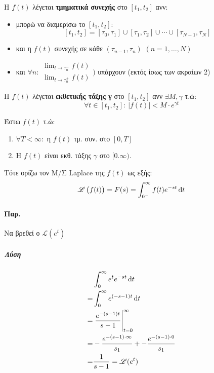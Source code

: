 \documentclass[11pt,a4paper,titlepage,draft]{article}
\begin{document}
\begin{defn*}{}
Η $f(t)$ λέγεται \textbf{τμηματικά συνεχής} στο $[t_1,t_2]$ ανν:
\begin{itemize}
\item μπορώ να διαμερίσω το $[t_1,t_2]$:
\[
[t_1,t_2]=[\tau_0,\tau_1]\cup[\tau_1,\tau_2]\cup\cdots\cup[\tau_{N-1},\tau_N]
\]
\item και η $f(t)$ συνεχής σε κάθε $(\tau_{n-1},\tau_n)$ $(n=1,\dots,N)$
\item και \(\forall n: \begin{matrix}
\lim_{t\to\tau_n^-}f(t)\\
\lim_{t\to\tau_n^+}f(t)
\end{matrix})
\) υπάρχουν (εκτός ίσως των ακραίων 2)
\end{itemize}
\end{defn*}

\begin{defn*}{}
Η \(f(t)\) λέγεται \textbf{εκθετικής τάξης γ} στο $[t_1,t_2]$ ανν \(\exists M,\gamma\) τ.ώ:
\[
\forall t \in [t_1,t_2]:\ \left|f(t)\right|<M\cdot e^{\gamma t}
\]
\end{defn*}

\begin{defn*}{}
Έστω $f(t)$ τ.ώ:
\begin{enumerate}
\item \(\forall T<\infty: \) η $f(t)$ τμ. συν. στο \([0,T]\)
\item Η $f(t)$ είναι εκθ. τάξης $\gamma$ στο \([0.\infty)\).
\end{enumerate}

Τότε ορίζω τον Μ/Σ \textlatin{Laplace} της $f(t)$ ως εξής:
\[
\mathscr{L}\left(f(t)\right) = F(s)=\int_{0^-}^\infty f(t)e^{-st}\dif t
\]
\end{defn*}

\paragraph{Παρ.}
Να βρεθεί ο $\mathscr{L}(e^t)$
\subparagraph{Λύση}
\begin{align*}
&\int_0^\infty e^te^{-st}\dif t\\
=&\int_0^\infty e^{(-s-1)t} \dif t\\
=& \left. \frac{e^{-(s-1)t}}{s-1}\right|_{t=0}^\infty\\
=&-\frac{e^{-(s-1)\cdot\infty}}{s_1}+-\frac{e^{-(s-1)\cdot0}}{s_1}\\
=&\frac{1}{s-1}=\mathscr{L}(e^t)
\end{align*}
\end{document}
